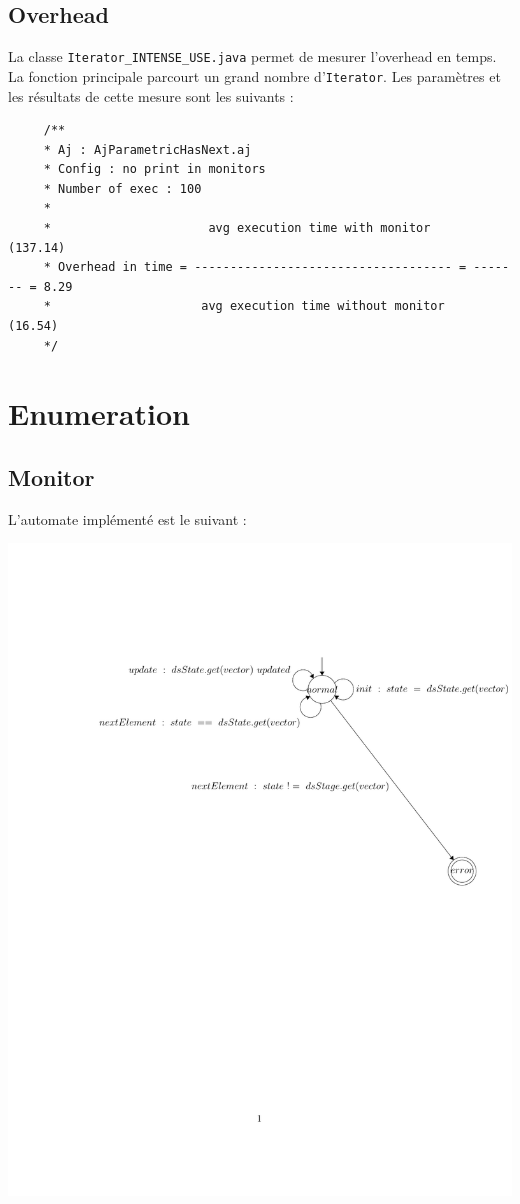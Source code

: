 \documentclass{article}
\begin{document}
\subsection{Overhead}

La classe \texttt{Iterator\_INTENSE\_USE.java} permet de mesurer l'overhead en
temps.
La fonction principale parcourt un grand nombre d'\texttt{Iterator}. Les paramètres
et les résultats de cette mesure sont les suivants :

\vspace{0.3cm}
\begin{verbatim}
     /**
     * Aj : AjParametricHasNext.aj
     * Config : no print in monitors 
     * Number of exec : 100
     * 
     *                      avg execution time with monitor      (137.14)
     * Overhead in time = ------------------------------------ = ------- = 8.29
     *                     avg execution time without monitor    (16.54)
     */
\end{verbatim}

\section{Enumeration}

\subsection{Monitor}

L'automate implémenté est le
suivant :

\begin{center}
\includegraphics[width=14.5cm, clip, trim=3cm 12.5cm 0cm
4cm]{enumeration.pdf}
\end{center}
\end{document}
